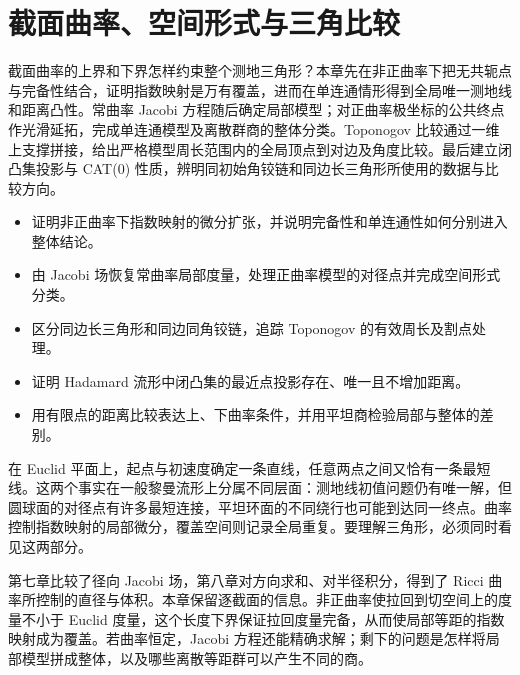 
% 
% 

\chapter{截面曲率、空间形式与三角比较}
\label{g3:ch:09}

\begin{chapterabstract}
	截面曲率的上界和下界怎样约束整个测地三角形？本章先在非正曲率下把无共轭点与完备性结合，证明指数映射是万有覆盖，进而在单连通情形得到全局唯一测地线和距离凸性。常曲率 Jacobi 方程随后确定局部模型；对正曲率极坐标的公共终点作光滑延拓，完成单连通模型及离散群商的整体分类。Toponogov 比较通过一维上支撑拼接，给出严格模型周长范围内的全局顶点到对边及角度比较。最后建立闭凸集投影与 CAT(0) 性质，辨明同初始角铰链和同边长三角形所使用的数据与比较方向。
\end{chapterabstract}

\begin{learninggoals}
	\begin{itemize}
		\item 证明非正曲率下指数映射的微分扩张，并说明完备性和单连通性如何分别进入整体结论。
		\item 由 Jacobi 场恢复常曲率局部度量，处理正曲率模型的对径点并完成空间形式分类。
		\item 区分同边长三角形和同边同角铰链，追踪 Toponogov 的有效周长及割点处理。
		\item 证明 Hadamard 流形中闭凸集的最近点投影存在、唯一且不增加距离。
		\item 用有限点的距离比较表达上、下曲率条件，并用平坦商检验局部与整体的差别。
	\end{itemize}
\end{learninggoals}

在 Euclid 平面上，起点与初速度确定一条直线，任意两点之间又恰有一条最短线。这两个事实在一般黎曼流形上分属不同层面：测地线初值问题仍有唯一解，但圆球面的对径点有许多最短连接，平坦环面的不同绕行也可能到达同一终点。曲率控制指数映射的局部微分，覆盖空间则记录全局重复。要理解三角形，必须同时看见这两部分。

\ProseParagraphBreak

第七章比较了径向 Jacobi 场，第八章对方向求和、对半径积分，得到了 Ricci 曲率所控制的直径与体积。本章保留逐截面的信息。非正曲率使拉回到切空间上的度量不小于 Euclid 度量，这个长度下界保证拉回度量完备，从而使局部等距的指数映射成为覆盖。若曲率恒定，Jacobi 方程还能精确求解；剩下的问题是怎样将局部模型拼成整体，以及哪些离散等距群可以产生不同的商。

